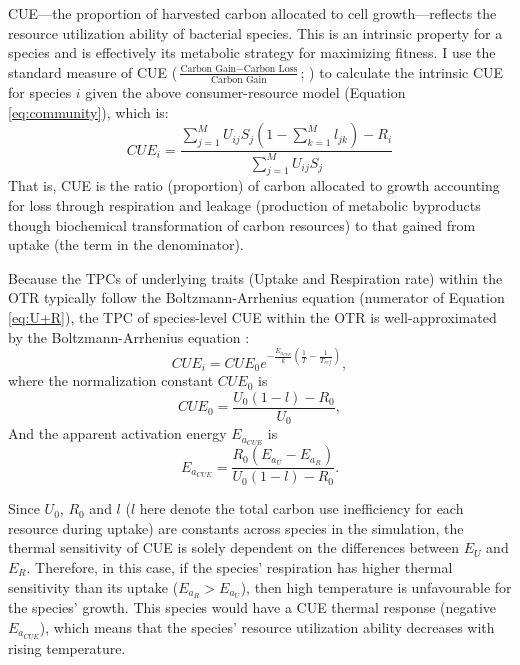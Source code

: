 \documentclass[11pt, a4paper]{article}
\begin{document}
\begin{spacing}{1.5}
CUE---the proportion of harvested carbon allocated to cell growth---reflects the resource utilization ability of bacterial species. This is an intrinsic property for a species and is effectively its metabolic strategy for maximizing fitness.  I use the standard measure of CUE ($\frac{\text{Carbon Gain} - \text {Carbon Loss}}{\text{Carbon Gain}}$; \citep{manzoni2012environmental}) to calculate the intrinsic CUE for species $i$ given the above consumer-resource model (Equation \ref{eq:community}), which is:
\begin{equation}\label{eq:CUE_i}
CUE_i = \frac{\sum\limits _{j=1}^{M}U_{ij}S_j(1-\sum\limits_{k=1}^{M}l_{jk}) - R_i}{\sum\limits _{j=1}^{M}U_{ij}S_j}
\end{equation}
That is, CUE is the ratio (proportion) of carbon allocated to growth accounting for loss through respiration and leakage (production of metabolic byproducts though biochemical transformation of carbon resources) to that gained from uptake (the term in the denominator). 

Because the TPCs of underlying traits (Uptake and Respiration rate) within the OTR typically follow the Boltzmann-Arrhenius equation (numerator of Equation \ref{eq:U+R}), the TPC of species-level CUE within the OTR is well-approximated by the Boltzmann-Arrhenius equation \citep{smith2020systematic}:
\begin{equation*}
    CUE_i = CUE_0e^{-\frac{E_{a_{CUE}}}{k}(\frac{1}{T} - \frac{1}{T_{ref}})},
\end{equation*}
where the normalization constant $CUE_0$ is
\begin{equation}\label{eq:CUE0}
    CUE_0 = \frac{U_0(1 - l) - R_0}{U_0},
\end{equation}
And the apparent activation energy $E_{a_{CUE}}$ is 
\begin{equation}\label{eq:EaCUE}
    E_{a_{CUE}} = \frac{R_0(E_{a_U} - E_{a_R})}{U_0(1-l) - R_0}.
\end{equation}

Since $U_0$, $R_0$ and $l$ ($l$ here denote the total carbon use inefficiency for each resource during uptake) are constants across species in the simulation, the thermal sensitivity of CUE is solely dependent on the differences between $E_U$ and $E_R$. Therefore, in this case, if the species’ respiration has higher thermal sensitivity than its uptake ($E_{a_R} > E_{a_U}$), then high temperature is unfavourable for the species' growth. This species would have a CUE thermal response (negative $E_{a_{CUE}}$), which means that the species' resource utilization ability decreases with rising temperature. 


\end{spacing}
\end{document}
